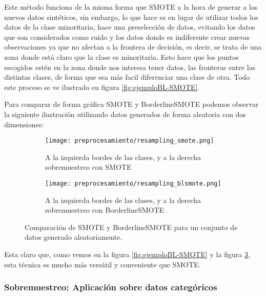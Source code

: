 Este método funciona de la misma forma que SMOTE a la hora de generar a los nuevos datos sintéticos, sin embargo, lo que hace es en lugar de utilizar todos los datos de la clase minoritaria, hace una preselección de datos, evitando los datos que son considerados como ruido y los datos donde es indiferente crear nuevas observaciones ya que no afectan a la frontera de decisión, es decir, se trata de una zona donde está claro que la clase es minoritaria. Esto hace que los puntos escogidos estén en la zona donde nos interesa tener datos, las fronteras entre las distintas clases, de forma que sea más facil diferenciar una clase de otra. Todo este proceso se ve ilustrado en figura \ref{fig:ejemploBL-SMOTE}.


Para comparar de forma gráfica SMOTE y BorderlineSMOTE podemos observar la siguiente ilustración utilizando datos generados de forma aleatoria con dos dimensiones:

\begin{figure}[H]
    \centering
	 \begin{subfigure}[b]{\textwidth}
		 \centering
		 \texttt{[image: preprocesamiento/resampling\_smote.png]}
		 \caption{A la izquierda bordes de las clases, y a la derecha sobremuestreo con SMOTE}
		 \label{fig:SMOTE-cmp}
	 \end{subfigure}

    \begin{subfigure}[b]{\textwidth}
		 \centering
		  \texttt{[image: preprocesamiento/resampling\_blsmote.png]}
        \caption{A la izquierda bordes de las clases, y a la derecha sobremuestreo con BorderlineSMOTE}
        \label{fig:BLSMOTE-cmp}
    \end{subfigure}

    \caption{Comparación de SMOTE y BorderlineSMOTE para un conjunto de datos generado aleatoriamente.}\label{fig:BLSMOTE-SMOTE}

\end{figure}

Esta claro que, como vemos en la figura \ref{fig:ejemploBL-SMOTE} y la figura \ref{fig:BLSMOTE-SMOTE}, esta técnica es mucho más versátil y conveniente que SMOTE.


\subsubsection{Sobremuestreo: Aplicación sobre datos categóricos}

